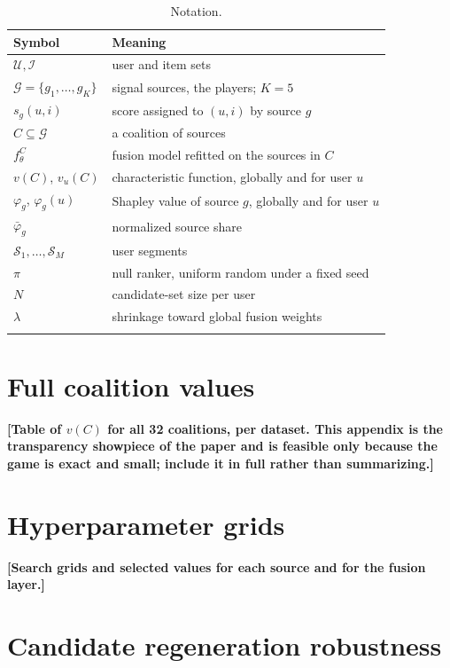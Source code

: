 \documentclass[pdflatex,sn-mathphys-num]{sn-jnl}%
\theoremstyle{thmstyleone}%
\theoremstyle{thmstyletwo}%
\theoremstyle{thmstylethree}%
\newcommand{\tbd}[1]{\textbf{[#1]}}
\newcommand{\Gset}{\mathcal{G}}
\newcommand{\Uset}{\mathcal{U}}
\newcommand{\Iset}{\mathcal{I}}
\begin{document}
\begin{appendices}
\begin{table}[h]
\caption{Notation.}\label{taba1}
\begin{tabular}{@{}ll@{}}
\toprule
Symbol & Meaning \\
\midrule
$\Uset,\Iset$              & user and item sets \\
$\Gset=\{g_1,\dots,g_K\}$  & signal sources, the players; $K=5$ \\
$s_g(u,i)$                 & score assigned to $(u,i)$ by source $g$ \\
$C\subseteq\Gset$          & a coalition of sources \\
$f_\theta^{C}$             & fusion model refitted on the sources in $C$ \\
$v(C)$, $v_u(C)$           & characteristic function, globally and for user $u$ \\
$\varphi_g$, $\varphi_g(u)$& Shapley value of source $g$, globally and for user $u$ \\
$\bar\varphi_g$            & normalized source share \\
$\mathcal{S}_1,\dots,\mathcal{S}_M$ & user segments \\
$\pi$                      & null ranker, uniform random under a fixed seed \\
$N$                        & candidate-set size per user \\
$\lambda$                  & shrinkage toward global fusion weights \\
\botrule
\end{tabular}
\end{table}

\section{Full coalition values}\label{secA2}

\tbd{Table of $v(C)$ for all 32 coalitions, per dataset. This appendix is the transparency showpiece of the paper and is feasible only because the game is exact and small; include it in full rather than summarizing.}

\section{Hyperparameter grids}\label{secA3}

\tbd{Search grids and selected values for each source and for the fusion layer.}

\section{Candidate regeneration robustness}\label{secA4}


\end{appendices}
\end{document}
